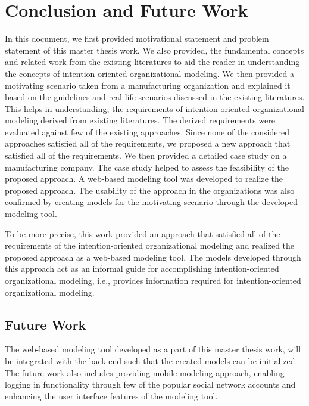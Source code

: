 \chapter{Conclusion and Future Work}
\label{chap:conclusion}

In this document, we first provided motivational statement and problem statement of this master thesis work. We also provided, the fundamental concepts and related work from the existing literatures to aid the reader in understanding the concepts of intention-oriented organizational modeling. We then provided a motivating scenario taken from a manufacturing organization and explained it based on the guidelines and real life scenarios discussed in the existing literatures. This helps in understanding, the requirements of intention-oriented organizational modeling derived from existing literatures. The derived requirements were evaluated against few of the existing approaches. Since none of the considered approaches satisfied all of the requirements, we proposed a new approach that satisfied all of the requirements. We then provided a detailed case study on a manufacturing company. The case study helped to assess the feasibility of the proposed approach. A web-based modeling tool was developed to realize the proposed approach. The usability of the approach in the organizations was also confirmed by creating models for the motivating scenario through the developed modeling tool.  

To be more precise, this work provided an approach that satisfied all of the requirements of the intention-oriented organizational modeling and realized the proposed approach as a web-based modeling tool. The models developed through this approach act as an informal guide for accomplishing intention-oriented organizational modeling, i.e., provides information required for intention-oriented organizational modeling. 

\section*{Future Work}
\label{sec:futurework}
The web-based modeling tool developed as a part of this master thesis work, will be integrated with the back end such that the created models can be initialized. The future work also includes providing mobile modeling approach, enabling logging in functionality through few of the popular social network accounts and enhancing the user interface features of the modeling tool. 





